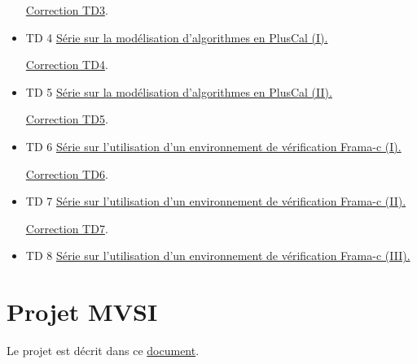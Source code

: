 \documentclass[ 12pt]{article}
\begin{document}
\begin{tcolorbox}
\begin{itemize}
      \href{http://mery54.github.io/teaching/mvsi/lecturesnotes/ctd3.pdf}{Correction 
       TD3}.

\item[]   TD 4
    \href{http://mery54.github.io/teaching/mvsi/lecturesnotes/td4.pdf}{
      Série sur la mod\'elisation d'algorithmes en PlusCal  (I).}


      \href{http://mery54.github.io/teaching/mvsi/lecturesnotes/ctd4.pdf}{Correction 
       TD4}.


\item[]   TD 5
    \href{http://mery54.github.io/teaching/mvsi/lecturesnotes/td5.pdf}{
      Série sur la mod\'elisation d'algorithmes en PlusCal  (II).}


      \href{http://mery54.github.io/teaching/mvsi/lecturesnotes/ctd5.pdf}{Correction 
       TD5}.

     
\item[]   TD 6
    \href{http://mery54.github.io/teaching/mvsi/lecturesnotes/td6.pdf}{
      Série sur l'utilisation d'un environnement de  v\'erification Frama-c 
      (I).}
    

      \href{http://mery54.github.io/teaching/mvsi/lecturesnotes/ctd6.pdf}{Correction 
       TD6}.
    
     
\item[]   TD 7
    \href{http://mery54.github.io/teaching/mvsi/lecturesnotes/td7.pdf}{
      Série sur l'utilisation d'un environnement de  v\'erification Frama-c 
      (II).}
    

      \href{http://mery54.github.io/teaching/mvsi/lecturesnotes/ctd7.pdf}{Correction 
       TD7}.

     
\item[]   TD 8
    \href{http://mery54.github.io/teaching/mvsi/lecturesnotes/td8.pdf}{
      Série sur l'utilisation d'un environnement de  v\'erification Frama-c 
      (III).}
    


     

  \end{itemize}

  
  \section{Projet MVSI}
\label{sec:project}

Le  projet est décrit   dans ce     \href{http://mery54.github.io/teaching/mvsi/lecturesnotes/projet2024.pdf}{document}.


\end{tcolorbox}
\end{document}
